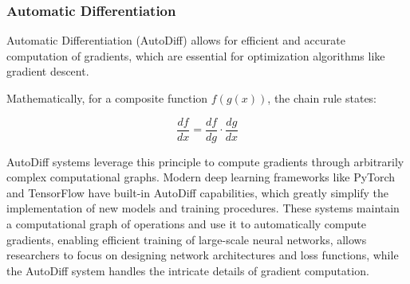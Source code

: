 \documentclass[a4paper, oneside]{discothesis}
\begin{document}
\subsubsection{Automatic Differentiation}

Automatic Differentiation (AutoDiff) allows for efficient and accurate computation of gradients, which are essential for optimization algorithms like gradient descent.

Mathematically, for a composite function $f(g(x))$, the chain rule states:

\begin{equation}
    \frac{df}{dx} = \frac{df}{dg} \cdot \frac{dg}{dx}
\end{equation}

AutoDiff systems leverage this principle to compute gradients through arbitrarily complex computational graphs. Modern deep learning frameworks like PyTorch and TensorFlow have built-in AutoDiff capabilities, which greatly simplify the implementation of new models and training procedures. These systems maintain a computational graph of operations and use it to automatically compute gradients, enabling efficient training of large-scale neural networks, allows researchers to focus on designing network architectures and loss functions, while the AutoDiff system handles the intricate details of gradient computation.
\end{document}
